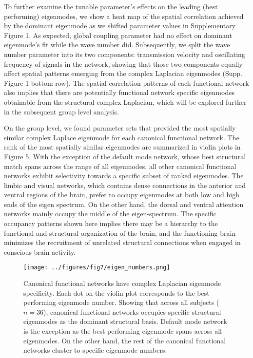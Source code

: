 \documentclass{article}
\begin{document}
To further examine the tunable parameter's effects on the leading (best performing) eigenmodes, we show a heat map of the spatial correlation achieved by the dominant eigenmode as we shifted parameter values in Supplementary Figure 1. As expected, global coupling parameter had no effect on dominant eigenmode's fit while the wave number did. Subsequently, we split the wave number parameter into its two components: transmission velocity and oscillating frequency of signals in the network, showing that those two components equally affect spatial patterns emerging from the complex Laplacian eigenmodes (Supp. Figure 1 bottom row). The spatial correlation patterns of each functional network also implies that there are potentially functional network specific eigenmodes obtainable from the structural complex Laplacian, which will be explored further in the subsequent group level analysis.

On the group level, we found parameter sets that provided the most spatially similar complex Laplace eigenmode for each canonical functional network. The rank of the most spatially similar eigenmodes are summarized in violin plots in Figure 5. With  the exception of the default mode network, whose best structural match spans across the range of all eigenmodes, all other canonical functional networks exhibit selectivity towards a specific subset of ranked eigenmodes. The limbic and visual networks, which contains dense connections in the anterior and ventral regions of the brain,  prefer to occupy eigenmodes at both low and high ends of the eigen spectrum. On the other hand, the dorsal and ventral attention networks mainly occupy the middle of the eigen-spectrum. The specific occupancy patterns shown here implies there may be a hierarchy to the functional and structural organization of the brain, and the functioning brain minimizes the recruitment of unrelated structural connections when engaged in conscious brain activity. 

\begin{figure}[ht]
\texttt{[image: ../figures/fig7/eigen\_numbers.png]}
\caption{Canonical functional networks have complex Laplacian eigenmode specificity. Each dot on the violin plot corresponds to the best performing eigenmode number. Showing that across all subjects ($n = 36$), canonical functional networks occupies specific structural eigenmodes as the dominant structural basis. Default mode network is the exception as the best performing eigenmode spans across all eigenmodes. On the other hand, the rest of the canonical functional networks cluster to specific eigenmode numbers.
}
\label{fig:fig5}
\end{figure}
\end{document}

